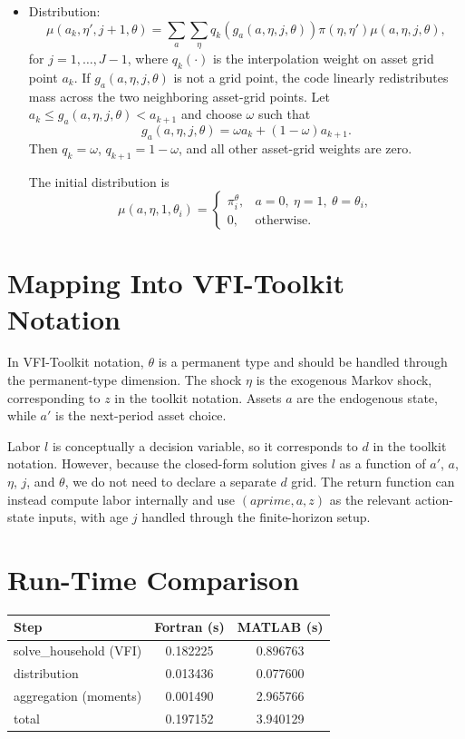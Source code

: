 \documentclass[11pt]{article}
\begin{document}
\begin{itemize}
Initial condition: at age 1, all individuals start with zero assets and the
middle transitory shock state, which corresponds to $z=0$ and hence
$\eta=1$. The permanent productivity type is distributed uniformly across
the two permanent types.

\item Distribution:
\[
\mu(a_k,\eta',j+1,\theta)
=\sum_a\sum_\eta
q_k(g_a(a,\eta,j,\theta))\pi(\eta,\eta')\mu(a,\eta,j,\theta),
\]
for $j=1,\ldots,J-1$, where $q_k(\cdot)$ is the interpolation weight on
asset grid point $a_k$. If $g_a(a,\eta,j,\theta)$ is not a grid point, the
code linearly redistributes mass across the two neighboring asset-grid
points. Let $a_k\leq g_a(a,\eta,j,\theta)<a_{k+1}$ and choose $\omega$ such
that
\[
g_a(a,\eta,j,\theta)=\omega a_k+(1-\omega)a_{k+1}.
\]
Then $q_k=\omega$, $q_{k+1}=1-\omega$, and all other asset-grid weights are
zero.

The initial distribution is
\[
\mu(a,\eta,1,\theta_i)=
\begin{cases}
\pi_i^\theta, & a=0,\ \eta=1,\ \theta=\theta_i,\\
0, & \text{otherwise}.
\end{cases}
\]
\end{itemize}

\section{Mapping Into VFI-Toolkit Notation}

In VFI-Toolkit notation, $\theta$ is a permanent type and should be handled
through the permanent-type dimension. The shock $\eta$ is the exogenous
Markov shock, corresponding to $z$ in the toolkit notation. Assets $a$ are
the endogenous state, while $a'$ is the next-period asset choice.

Labor $l$ is conceptually a decision variable, so it corresponds to $d$ in
the toolkit notation. However, because the closed-form solution gives $l$ as
a function of $a'$, $a$, $\eta$, $j$, and $\theta$, we do not need to declare
a separate $d$ grid. The return function can instead compute labor internally
and use $(aprime,a,z)$ as the relevant action-state inputs, with age $j$
handled through the finite-horizon setup.

\section{Run-Time Comparison}

\begin{center}
\begin{tabular}{lcc}
\hline
Step & Fortran (s) & MATLAB (s)\\
\hline
solve\_household (VFI) & 0.182225 & 0.896763\\
distribution & 0.013436 & 0.077600\\
aggregation (moments) & 0.001490 & 2.965766\\
\hline
total & 0.197152 & 3.940129\\
\hline
\end{tabular}
\end{center}
\end{document}
